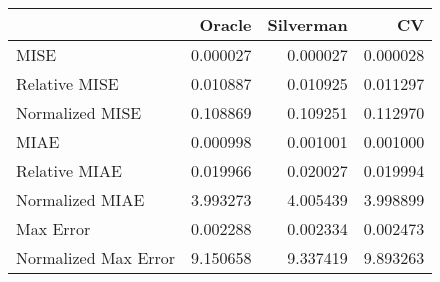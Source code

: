 \begin{tabular}{lrrr}
  \hline
 & Oracle & Silverman & CV \\ 
  \hline
MISE & 0.000027 & 0.000027 & 0.000028 \\ 
  Relative MISE & 0.010887 & 0.010925 & 0.011297 \\ 
  Normalized MISE & 0.108869 & 0.109251 & 0.112970 \\ 
  MIAE & 0.000998 & 0.001001 & 0.001000 \\ 
  Relative MIAE & 0.019966 & 0.020027 & 0.019994 \\ 
  Normalized MIAE & 3.993273 & 4.005439 & 3.998899 \\ 
  Max Error & 0.002288 & 0.002334 & 0.002473 \\ 
  Normalized Max Error & 9.150658 & 9.337419 & 9.893263 \\ 
   \hline
\end{tabular}
